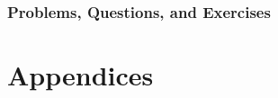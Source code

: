 \documentclass[11pt,fleqn]{book} %
\begin{document}
    \section*{Problems, Questions, and Exercises}
    
\part{Appendices}
\begin{appendices}


\end{appendices}
\end{document}
